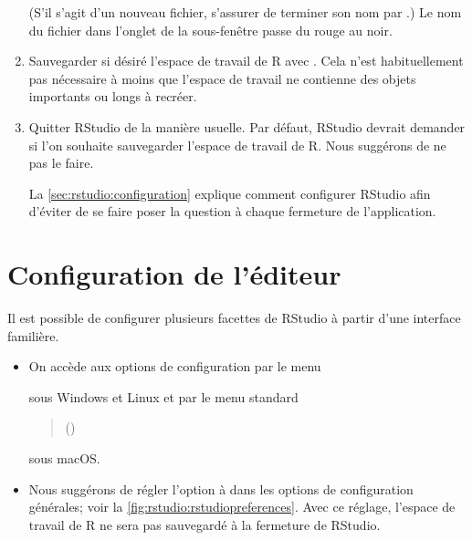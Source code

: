 \begin{enumerate}
\begin{trivlist}
    \hfill
  \end{trivlist}
  (S'il s'agit d'un nouveau fichier, s'assurer de terminer son nom par
  .) Le nom du fichier dans l'onglet de la sous-fenêtre passe
  du rouge au noir.
\item Sauvegarder si désiré l'espace de travail de R avec
  . Cela n'est
  habituellement pas nécessaire à moins que l'espace de travail ne
  contienne des objets importants ou longs à recréer.
\item Quitter RStudio de la manière usuelle. Par défaut, RStudio
  devrait demander si l'on souhaite sauvegarder l'espace de travail de
  R. Nous suggérons de ne pas le faire.

  La \autoref{sec:rstudio:configuration} explique comment configurer
  RStudio afin d'éviter de se faire poser la question à chaque
  fermeture de l'application.
\end{enumerate}


\section{Configuration de l'éditeur}
\label{sec:rstudio:configuration}

Il est possible de configurer plusieurs facettes de RStudio à partir
d'une interface familière.
\begin{itemize}
\item On accède aux options de configuration par le menu
  \begin{quote}
  \end{quote}
  sous Windows et Linux et par le menu standard
  \begin{quote}
     (\code{\cmdkey\,,})
  \end{quote}
  sous macOS.
\item Nous suggérons de régler l'option  à  dans les options de configuration
  générales; voir la \autoref{fig:rstudio:rstudiopreferences}. Avec ce
  réglage, l'espace de travail de R ne sera pas sauvegardé à la
  fermeture de RStudio.
\end{itemize}

